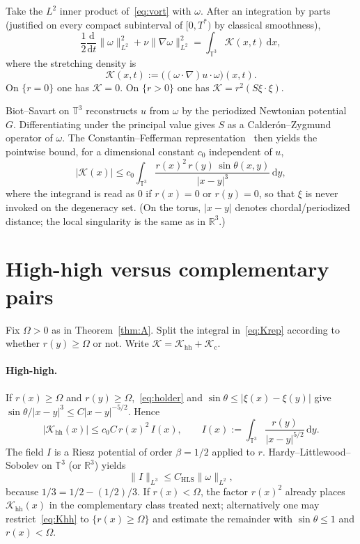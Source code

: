 \documentclass[11pt,a4paper]{article}
\theoremstyle{definition}
\theoremstyle{remark}
\newcommand{\R}{\mathbb{R}}
\newcommand{\T}{\mathbb{T}}
\newcommand{\abs}[1]{\lvert#1\rvert}
\newcommand{\norm}[1]{\lVert#1\rVert}
\newcommand{\dd}{\mathrm{d}}
\begin{document}
Take the \(L^2\) inner product of~\eqref{eq:vort} with \(\omega\). After
an integration by parts (justified on every compact subinterval of
\([0,T^*)\) by classical smoothness),
\begin{equation}
\label{eq:enstrophy}
\frac12\frac{\dd}{\dd t}\norm{\omega}_{L^2}^2+\nu\norm{\nabla\omega}_{L^2}^2
=\int_{\T^3}\mathcal K(x,t)\,\dd x,
\end{equation}
where the stretching density is
\begin{equation}
\label{eq:K}
\mathcal K(x,t):=\bigl((\omega\cdot\nabla)u\cdot\omega\bigr)(x,t).
\end{equation}
On \(\{r=0\}\) one has \(\mathcal K=0\). On \(\{r>0\}\) one has
\(\mathcal K=r^2(S\xi\cdot\xi)\).

Biot--Savart on \(\T^3\) reconstructs \(u\) from \(\omega\) by the
periodized Newtonian potential \(G\). Differentiating under the principal
value gives \(S\) as a Calder\'on--Zygmund operator of \(\omega\). The
Constantin--Fefferman representation~\cite{CF1993} then yields the pointwise
bound, for a dimensional constant \(c_0\) independent of \(u\),
\begin{equation}
\label{eq:Krep}
\abs{\mathcal K(x)}\le c_0\int_{\T^3}\frac{r(x)^2\,r(y)\,\sin\theta(x,y)}{\abs{x-y}^3}\,\dd y,
\end{equation}
where the integrand is read as \(0\) if \(r(x)=0\) or \(r(y)=0\), so that
\(\xi\) is never invoked on the degeneracy set. (On the torus, \(\abs{x-y}\)
denotes chordal/periodized distance; the local singularity is the same as
in \(\R^3\).)

\section{High-high versus complementary pairs}

Fix \(\Omega>0\) as in Theorem~\ref{thm:A}. Split the integral
in~\eqref{eq:Krep} according to whether \(r(y)\ge\Omega\) or not.
Write \(\mathcal K=\mathcal K_{\mathrm{hh}}+\mathcal K_{\mathrm{c}}\).

\paragraph{High-high.}
If \(r(x)\ge\Omega\) and \(r(y)\ge\Omega\),~\eqref{eq:holder} and
\(\sin\theta\le\abs{\xi(x)-\xi(y)}\) give
\(\sin\theta/\abs{x-y}^3\le C\abs{x-y}^{-5/2}\). Hence
\begin{equation}
\label{eq:Khh}
\abs{\mathcal K_{\mathrm{hh}}(x)}\le c_0 C\,r(x)^2\,I(x),
\qquad
I(x):=\int_{\T^3}\frac{r(y)}{\abs{x-y}^{5/2}}\,\dd y.
\end{equation}
The field \(I\) is a Riesz potential of order \(\beta=1/2\) applied to \(r\).
Hardy--Littlewood--Sobolev on \(\T^3\) (or \(\R^3\)) yields
\begin{equation}
\label{eq:HLS}
\norm{I}_{L^3}\le C_{\mathrm{HLS}}\norm{\omega}_{L^2},
\end{equation}
because \(1/3=1/2-(1/2)/3\). If \(r(x)<\Omega\), the factor \(r(x)^2\)
already places \(\mathcal K_{\mathrm{hh}}(x)\) in the complementary class
treated next; alternatively one may restrict~\eqref{eq:Khh} to
\(\{r(x)\ge\Omega\}\) and estimate the remainder with \(\sin\theta\le 1\)
and \(r(x)<\Omega\).
\end{document}
